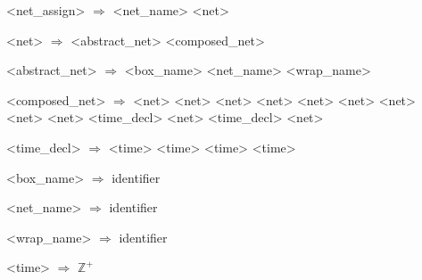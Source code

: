 \setlength{\grammarindent}{10em} %
\begin{grammar}
    <net\_assign> $\Rightarrow$ <net\_name> \lit{=} <net>

    <net> $\Rightarrow$ <abstract\_net>
    \alt <composed\_net>

    <abstract\_net> $\Rightarrow$ <box\_name>
    \alt <net\_name>
    \alt <wrap\_name>

    <composed\_net> $\Rightarrow$ <net>  <net>
    \alt <net> \lit{:} <net>
    \alt <net> \lit{|} <net>
    \alt <net> \lit{!} <net>
    \alt \lit{(} <net> \lit{)}
    \alt {} \lit{[} <time\_decl> \lit{]} \lit{(} <net> \lit{)}
    \alt {} \lit{[} <time\_decl> \lit{]} \lit{(} <net> \lit{)}

    <time\_decl> $\Rightarrow$ \Regex{[} <time>  \Regex{]} \Regex{[} <time>  \Regex{]} \Regex{[} <time>  \Regex{]} \Regex{[} <time>  \Regex{]}

    <box\_name> $\Rightarrow$ identifier

    <net\_name> $\Rightarrow$ identifier

    <wrap\_name> $\Rightarrow$ identifier

<time> $\Rightarrow$ $\mathbb{Z}^+$
\end{grammar}

